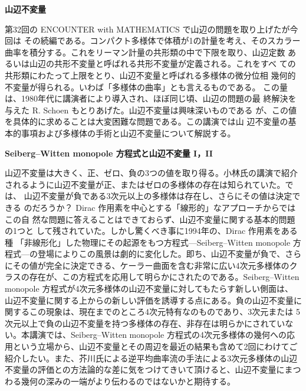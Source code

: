 \documentclass[uplatex,dvipdfmx]{jlreq}
\begin{document}
\begin{center}
{\large\bfseries 山辺不変量}\\[6pt]
\hspace*{\fill}{\large\bfseries 小林　治（熊本大・理）}
\end{center}

第32回の ENCOUNTER with MATHEMATICS で山辺の問題を取り上げたが今回は
その続編である。コンパクト多様体で体積が1の計量を考え、そのスカラー
曲率を積分する。これをリーマン計量の共形類の中で下限を取り、山辺定数
あるいは山辺の共形不変量と呼ばれる共形不変量が定義される。これをすべ
ての共形類にわたって上限をとり、山辺不変量と呼ばれる多様体の微分位相
幾何的不変量が得られる。いわば「多様体の曲率」とも言えるものである。
この量は、1980年代に講演者により導入され、ほぼ同じ頃、山辺の問題の最
終解決を与えた R. Schoen もとりあげた。山辺不変量は興味深いものである
が、この値を具体的に求めることは大変困難な問題である。この講演では山
辺不変量の基本的事項および多様体の手術と山辺不変量について解説する。
\vfill

\begin{center}
{\large\bfseries Seiberg--Witten monopole 方程式と山辺不変量 I，II}\\[6pt]
\hspace*{\fill}{\large\bfseries 石田 政司（上智大・理工）}
\end{center}

山辺不変量は大きく、正、ゼロ、負の3つの値を取り得る。小林氏の講演で紹介
されるように山辺不変量が正、またはゼロの多様体の存在は知られていた。では、
山辺不変量が負である3次元以上の多様体は存在し、さらにその値は決定できる
のだろうか？ Dirac 作用素を中心とする「線形的」なアプローチからではこの自
然な問題に答えることはできておらず、山辺不変量に関する基本的問題の1つと
して残されていた。しかし驚くべき事に1994年の、Dirac 作用素をある種
「非線形化」した物理にその起源をもつ方程式---Seiberg--Witten monopole 方
程式---の登場によりこの風景は劇的に変化した。即ち、山辺不変量が負で、さら
にその値が完全に決定できる、ケーラー曲面を含む非常に広い4次元多様体のク
ラスの存在が、この方程式を応用して明らかにされたのである。Seiberg--Witten
monopole 方程式が4次元多様体の山辺不変量に対してもたらす新しい側面は、
山辺不変量に関する上からの新しい評価を誘導する点にある。負の山辺不変量に
関するこの現象は、現在までのところ4次元特有なのものであり、3次元または
5次元以上で負の山辺不変量を持つ多様体の存在、非存在は明らかにされていな
い。本講演では、Seiberg--Witten monopole 方程式の4次元多様体の幾何への応
用という立場から、山辺不変量とその周辺を最近の結果も含めて2回にわけてご
紹介したい。また、芥川氏による逆平均曲率流の手法による3次元多様体の山辺
不変量の評価との方法論的な差に気をつけてきいて頂けると、山辺不変量にまつ
わる幾何の深みの一端がより伝わるのではないかと期待する。
\vfill
\end{document}
